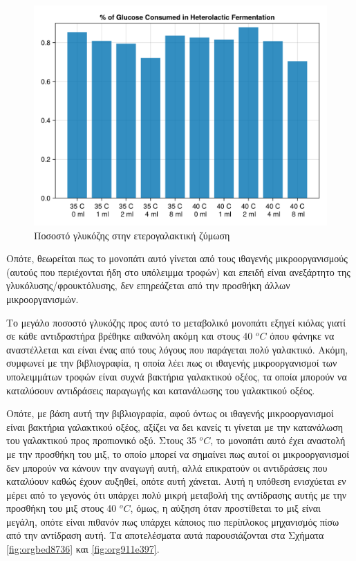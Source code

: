 \documentclass[11pt]{report}
\begin{document}
\begin{figure}[htbp]
\centering
\includegraphics[width=.9\linewidth]{../plots/metabolic_results/heterolactate_flux.png}
\caption{\label{fig:org80509e2}Ποσοστό γλυκόζης στην ετερογαλακτική ζύμωση}
\end{figure}

Οπότε, θεωρείται πως το μονοπάτι αυτό γίνεται από τους ιθαγενής μικροοργανισμούς (αυτούς που περιέχονται ήδη στο υπόλειμμα τροφών) και επειδή είναι ανεξάρτητο της γλυκόλυσης/φρουκτόλυσης, δεν επηρεάζεται από την προσθήκη άλλων μικροοργανισμών.

Το μεγάλο ποσοστό γλυκόζης προς αυτό το μεταβολικό μονοπάτι εξηγεί κιόλας γιατί σε κάθε αντιδραστήρα βρέθηκε αιθανόλη ακόμη και στους 40 \(^oC\) όπου φάνηκε να αναστέλλεται και είναι ένας από τους λόγους που παράγεται πολύ γαλακτικό. Ακόμη, συμφωνεί με την βιβλιογραφία, η οποία λέει πως οι ιθαγενής μικροοργανισμοί των υπολειμμάτων τροφών είναι συχνά βακτήρια γαλακτικού οξέος, τα οποία μπορούν να καταλύσουν αντιδράσεις παραγωγής και κατανάλωσης του γαλακτικού οξέος.

Οπότε, με βάση αυτή την βιβλιογραφία, αφού όντως οι ιθαγενής μικροοργανισμοί είναι βακτήρια γαλακτικού οξέος, αξίζει να δει κανείς τι γίνεται με την κατανάλωση του γαλακτικού προς προπιονικό οξύ. Στους 35 \(^oC\), το μονοπάτι αυτό έχει αναστολή με την προσθήκη του μιξ, το οποίο μπορεί να σημαίνει πως αυτοί οι μικροοργανισμοί δεν μπορούν να κάνουν την αναγωγή αυτή, αλλά επικρατούν οι αντιδράσεις που καταλύουν καθώς έχουν αυξηθεί, οπότε αυτή χάνεται. Αυτή η υπόθεση ενισχύεται εν μέρει από το γεγονός ότι υπάρχει πολύ μικρή μεταβολή της αντίδρασης αυτής με την προσθήκη του μιξ στους 40 \(^oC\), όμως, η αύξηση όταν προστίθεται το μιξ είναι μεγάλη, οπότε είναι πιθανόν πως υπάρχει κάποιος πιο περίπλοκος μηχανισμός πίσω από την αντίδραση αυτή. Τα αποτελέσματα αυτά παρουσιάζονται στα Σχήματα \ref{fig:orgbed8736} και \ref{fig:org911e397}. 
\end{document}
